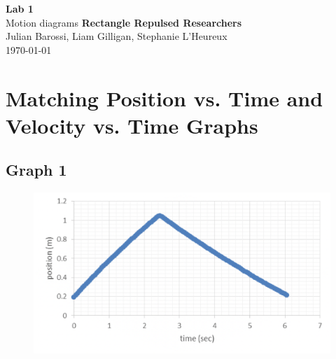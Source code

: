 \documentclass[11pt, letterpaper, includehead]{article}
\begin{document}
  \begin{titlepage} 
    \begin{center}
      \Huge{\textbf{Lab 1}}\\
      \Huge{Motion diagrams}
      \vfill
      \large{\textbf{Rectangle Repulsed Researchers}}\\
      \large{Julian Barossi, Liam Gilligan, Stephanie L'Heureux}\\
      \vspace{0.5cm}
      \normalsize
      \today
    \end{center}
  \end{titlepage}

  \tableofcontents
  \pagebreak %


  \pagestyle{fancy}
  \fancyhead{}

  
  \setcounter{section}{2} %
  \section{Matching Position vs. Time and Velocity vs. Time Graphs}
  \subsection{Graph 1}

  \begin{figure}[H] %
    \centering 
    \includegraphics[width=\linewidth]{graph_1.png}
    \label{fig:graph1}
  \end{figure}
\end{document}
